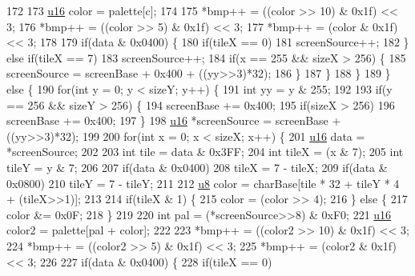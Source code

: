 \begin{DoxyCode}
172         
173         \mbox{\hyperlink{_system_8h_a9e6c91d77e24643b888dbd1a1a590054}{u16}} color = palette[c];
174         
175         *bmp++ = ((color >> 10) & 0x1f) << 3;
176         *bmp++ = ((color >> 5) & 0x1f) << 3;
177         *bmp++ = (color & 0x1f) << 3;      
178       
179         \textcolor{keywordflow}{if}(data & 0x0400) \{
180           \textcolor{keywordflow}{if}(tileX == 0)
181             screenSource++;
182         \} \textcolor{keywordflow}{else} \textcolor{keywordflow}{if}(tileX == 7)
183           screenSource++;
184         \textcolor{keywordflow}{if}(x == 255 && sizeX > 256) \{
185           screenSource = screenBase + 0x400 + ((yy>>3)*32);
186         \}
187       \}
188     \}
189   \} \textcolor{keywordflow}{else} \{
190     \textcolor{keywordflow}{for}(\textcolor{keywordtype}{int} y = 0; y < sizeY; y++) \{
191       \textcolor{keywordtype}{int} yy = y & 255;
192 
193       \textcolor{keywordflow}{if}(y == 256 && sizeY > 256) \{
194         screenBase += 0x400;
195         \textcolor{keywordflow}{if}(sizeX > 256)
196           screenBase += 0x400;
197       \}
198       \mbox{\hyperlink{_system_8h_a9e6c91d77e24643b888dbd1a1a590054}{u16}} *screenSource = screenBase + ((yy>>3)*32);
199 
200       \textcolor{keywordflow}{for}(\textcolor{keywordtype}{int} x = 0; x < sizeX; x++) \{
201         \mbox{\hyperlink{_system_8h_a9e6c91d77e24643b888dbd1a1a590054}{u16}} data = *screenSource;
202         
203         \textcolor{keywordtype}{int} tile = data & 0x3FF;
204         \textcolor{keywordtype}{int} tileX = (x & 7);
205         \textcolor{keywordtype}{int} tileY = y & 7;
206 
207         \textcolor{keywordflow}{if}(data & 0x0400)
208           tileX = 7 - tileX;
209         \textcolor{keywordflow}{if}(data & 0x0800)
210           tileY = 7 - tileY;
211         
212         \mbox{\hyperlink{_system_8h_aed742c436da53c1080638ce6ef7d13de}{u8}} color = charBase[tile * 32 + tileY * 4 + (tileX>>1)];
213         
214         \textcolor{keywordflow}{if}(tileX & 1) \{
215           color = (color >> 4);
216         \} \textcolor{keywordflow}{else} \{
217           color &= 0x0F;
218         \}
219 
220         \textcolor{keywordtype}{int} pal = (*screenSource>>8) & 0xF0;
221         \mbox{\hyperlink{_system_8h_a9e6c91d77e24643b888dbd1a1a590054}{u16}} color2 = palette[pal + color];
222 
223         *bmp++ = ((color2 >> 10) & 0x1f) << 3;
224         *bmp++ = ((color2 >> 5) & 0x1f) << 3;
225         *bmp++ = (color2 & 0x1f) << 3;
226         
227         \textcolor{keywordflow}{if}(data & 0x0400) \{
228           \textcolor{keywordflow}{if}(tileX == 0)

\end{DoxyCode}
